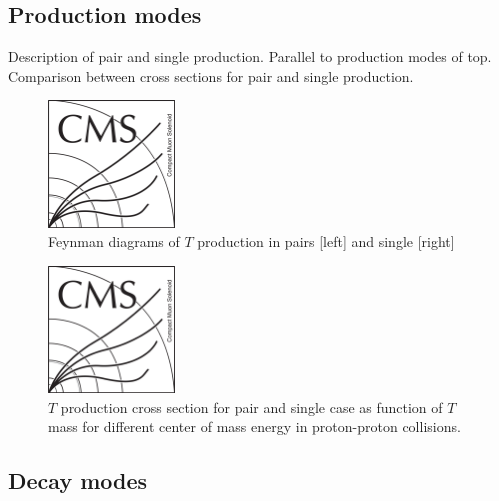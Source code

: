 \subsection{Production modes}
\label{sec:prod}

Description of pair and single production. Parallel to production modes of top. Comparison between cross sections for pair and single production.

\begin{figure}[!Hhtbp]
  \begin{center}
    \includegraphics[width=0.3\textwidth]{figs/CMSlogo.png}
    \caption{Feynman diagrams of $T$ production in pairs [left] and single [right]}
    \label{fig:ProdDiag}
  \end{center}
\end{figure}

\begin{figure}[!Hhtbp]
  \begin{center}
    \includegraphics[width=0.3\textwidth]{figs/CMSlogo.png}
    \caption{$T$ production cross section for pair and single case as function of $T$ mass for different center of mass energy in proton-proton collisions.}
    \label{fig:TProdXS}
  \end{center}
\end{figure}

\subsection{Decay modes}
\label{sec:decay}

